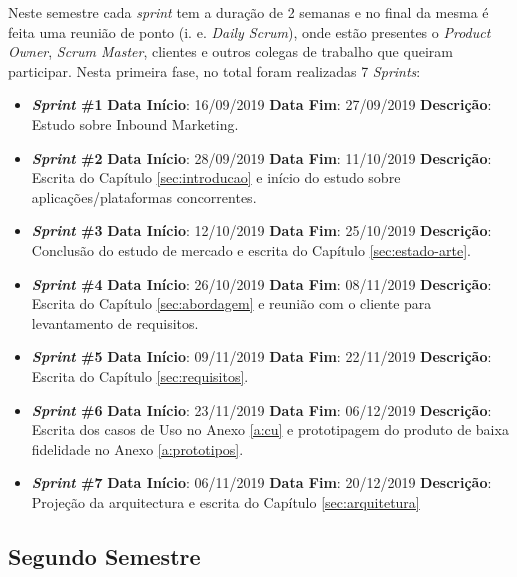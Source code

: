Neste semestre cada \textit{sprint} tem a duração de 2 semanas e no final da mesma é feita uma reunião de ponto (i. e. \textit{Daily Scrum}), onde estão presentes o \textit{Product Owner}, \textit{Scrum Master}, clientes e outros colegas de trabalho que queiram participar. Nesta primeira fase, no total foram realizadas 7 \textit{Sprints}:

\begin{itemize}
	\item \textbf{\textit{Sprint} \#1}
		\subitem \textbf{Data Início}: 16/09/2019
		\subitem \textbf{Data Fim}: 27/09/2019
		\subitem \textbf{Descrição}: Estudo sobre Inbound Marketing.
	\item \textbf{\textit{Sprint} \#2}
		\subitem \textbf{Data Início}: 28/09/2019
		\subitem \textbf{Data Fim}: 11/10/2019
		\subitem \textbf{Descrição}: Escrita do Capítulo \ref{sec:introducao} e início do estudo sobre aplicações/plataformas concorrentes.
	\item \textbf{\textit{Sprint} \#3}
		\subitem \textbf{Data Início}: 12/10/2019
		\subitem \textbf{Data Fim}: 25/10/2019
		\subitem \textbf{Descrição}: Conclusão do estudo de mercado e escrita do Capítulo \ref{sec:estado-arte}.
	\item \textbf{\textit{Sprint} \#4}
		\subitem \textbf{Data Início}: 26/10/2019
		\subitem \textbf{Data Fim}: 08/11/2019
		\subitem \textbf{Descrição}: Escrita do Capítulo \ref{sec:abordagem} e reunião com o cliente para levantamento de requisitos.
	\item \textbf{\textit{Sprint} \#5}
		\subitem \textbf{Data Início}: 09/11/2019
		\subitem \textbf{Data Fim}: 22/11/2019
		\subitem \textbf{Descrição}: Escrita do Capítulo \ref{sec:requisitos}.
	\item \textbf{\textit{Sprint} \#6}
		\subitem \textbf{Data Início}: 23/11/2019
		\subitem \textbf{Data Fim}: 06/12/2019
		\subitem \textbf{Descrição}:  Escrita dos casos de Uso no Anexo \ref{a:cu} e prototipagem do produto de baixa fidelidade no Anexo \ref{a:prototipos}.
	\item \textbf{\textit{Sprint} \#7}
		\subitem \textbf{Data Início}: 06/11/2019
		\subitem \textbf{Data Fim}: 20/12/2019
		\subitem \textbf{Descrição}: Projeção da arquitectura e escrita do Capítulo \ref{sec:arquitetura}
\end{itemize}


\subsection{Segundo Semestre}
\label{sec:sprints}

